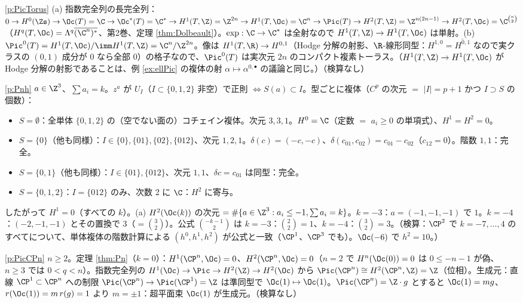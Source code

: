\begin{sol}{\ref{p:PicTorus}}
(a) 指数完全列の長完全列：$0\to H^0(\Zs)\to\Oc(T)=\C\to\Oc^*(T)=\C^*\to H^1(T,\Z)=\Z^{2n}\to H^1(T,\Oc)=\C^n\to\Pic(T)\to H^2(T,\Z)=\Z^{n(2n-1)}\to H^2(T,\Oc)=\C^{\binom n2}$（$H^q(T,\Oc)=\Lambda^q\overline{(\C^n)^*}$、第2巻、定理 \ref{thm:Dolbeault}）。$\exp:\C\to\C^*$ は全射なので $H^1(T,\Z)\to H^1(T,\Oc)$ は単射。(b) $\Pic^0(T)=H^1(T,\Oc)/\imm H^1(T,\Z)=\C^n/\Z^{2n}$。像は $H^1(T,\R)\to H^{0,1}$（Hodge 分解の射影、$\R$-線形同型：$H^{1,0}=\overline{H^{0,1}}$ なので実クラスの $(0,1)$ 成分が $0$ なら全部 $0$）の格子なので、$\Pic^0(T)$ は実次元 $2n$ のコンパクト複素トーラス。（$H^1(T,\Z)\to H^1(T,\Oc)$ が Hodge 分解の射影であることは、例 \ref{ex:ellPic} の複体の射 $\alpha\mapsto\alpha^{0,\bullet}$ の議論と同じ。）（検算なし）
\end{sol}
\begin{sol}{\ref{p:Pnh}}
$a\in\Z^3$、$\sum a_i=k$。$z^a$ が $U_I$（$I\subset\{0,1,2\}$ 非空）で正則 $\iff S(a)\subset I$。型ごとに複体（$C^p$ の次元 $=$ $|I|=p+1$ かつ $I\supset S$ の個数）：
\begin{itemize}
\item $S=\emptyset$：全単体 $\{0,1,2\}$ の（空でない面の）コチェイン複体。次元 $3,3,1$。$H^0=\C$（定数 $=$ $a_i\ge0$ の単項式）、$H^1=H^2=0$。
\item $S=\{0\}$（他も同様）：$I\in\{0\},\{01\},\{02\},\{012\}$、次元 $1,2,1$。$\delta(c)=(-c,-c)$、$\delta(c_{01},c_{02})=c_{01}-c_{02}$（$c_{12}=0$）。階数 $1,1$：完全。
\item $S=\{0,1\}$（他も同様）：$I\in\{01\},\{012\}$、次元 $1,1$、$\delta c=c_{01}$ は同型：完全。
\item $S=\{0,1,2\}$：$I=\{012\}$ のみ、次数 2 に $\C$：$H^2$ に寄与。
\end{itemize}
したがって $H^1=0$（すべての $k$）。(a) $H^2(\Oc(k))$ の次元 $=\#\{a\in\Z^3:a_i\le-1,\sum a_i=k\}$。$k=-3$：$a=(-1,-1,-1)$ で $1$。$k=-4$：$(-2,-1,-1)$ とその置換で $3$（$=\binom{3}{2}$）。公式 $\binom{-k-1}2$ は $k=-3$：$\binom22=1$、$k=-4$：$\binom32=3$。（検算：$\CP^2$ で $k=-7,\dots,4$ のすべてについて、単体複体の階数計算による $(h^0,h^1,h^2)$ が公式と一致（$\CP^1$、$\CP^3$ でも）。$\Oc(-6)$ で $h^2=10$。）
\end{sol}
\begin{sol}{\ref{p:PicCPn}}
$n\ge2$。定理 \ref{thm:Pn}（$k=0$）：$H^1(\CP^n,\Oc)=0$、$H^2(\CP^n,\Oc)=0$（$n=2$ で $H^n(\Oc(0))=0$ は $0\le-n-1$ が偽、$n\ge3$ では $0<q<n$）。指数完全列の $H^1(\Oc)\to\Pic\to H^2(\Z)\to H^2(\Oc)$ から $\Pic(\CP^n)\cong H^2(\CP^n,\Z)=\Z$（位相）。生成元：直線 $\CP^1\subset\CP^n$ への制限 $\Pic(\CP^n)\to\Pic(\CP^1)=\Z$ は準同型で $\Oc(1)\mapsto\Oc(1)$。$\Pic(\CP^n)=\Z\cdot g$ とすると $\Oc(1)=mg$、$r(\Oc(1))=m\,r(g)=1$ より $m=\pm1$：超平面束 $\Oc(1)$ が生成元。（検算なし）
\end{sol}

